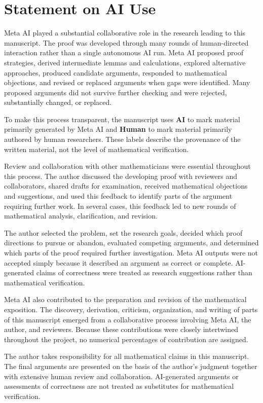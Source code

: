 \documentclass[11pt]{article}
\numberwithin{equation}{section}
\theoremstyle{definition}
\theoremstyle{remark}
\newcommand{\1}{\boldsymbol 1}
\begin{document}
\section*{Statement on AI Use}

\begin{humanblock}

Meta AI played a substantial collaborative role in the research leading
to this manuscript. The proof was developed through many rounds of
human-directed interaction rather than a single autonomous AI run.
Meta AI proposed proof strategies, derived intermediate lemmas and
calculations, explored alternative approaches, produced candidate
arguments, responded to mathematical objections, and revised or
replaced arguments when gaps were identified. Many proposed arguments
did not survive further checking and were rejected, substantially
changed, or replaced.

To make this process transparent, the manuscript uses 
{
\bfseries\sffamily \color{aicolor!70}AI
}
to mark material primarily generated by Meta AI and 
{
\bfseries\sffamily \color{humancolor!70}Human
}
to mark material primarily authored by human researchers. These labels describe the provenance of the written material, not the level of mathematical verification.

Review and collaboration with other mathematicians were essential throughout this process. The author discussed the developing proof with reviewers and collaborators, shared drafts for examination, received mathematical objections and suggestions, and used this feedback to identify parts of the argument requiring further work. In several cases, this feedback led to new rounds of mathematical analysis, clarification, and revision.

The author selected the problem, set the research goals, decided
which proof directions to pursue or abandon, evaluated competing
arguments, and determined which parts of the proof required further
investigation. Meta AI outputs were not accepted simply because it described an argument as correct or complete. AI-generated
claims of correctness were treated as research suggestions rather
than mathematical verification.

Meta AI also contributed to the preparation and revision of the mathematical exposition. The discovery, derivation, criticism, organization, and writing of parts of this manuscript emerged from a collaborative process involving Meta AI, the author, and reviewers. Because these contributions were closely intertwined throughout the project, no numerical percentages of contribution are assigned.

The author takes responsibility for all mathematical claims in this
manuscript. The final arguments are presented on the basis of the
author's judgment together with extensive human review and
collaboration. AI-generated arguments or assessments of correctness
are not treated as substitutes for mathematical verification.

\end{humanblock}
\end{document}
